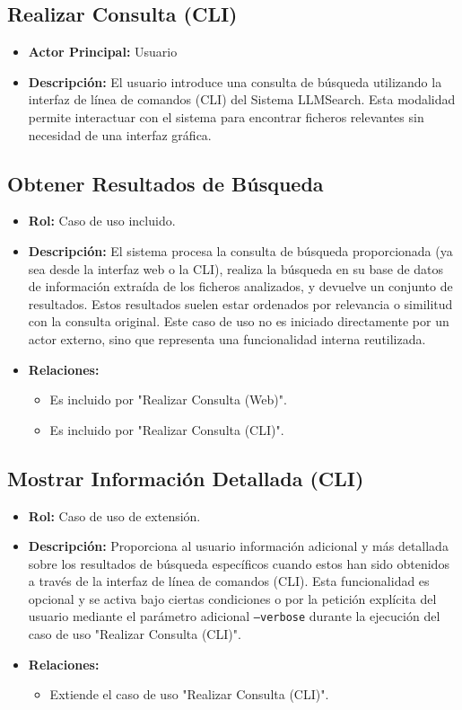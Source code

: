 \subsection{Realizar Consulta (CLI)}
\begin{itemize}
\item \textbf{Actor Principal:} Usuario
\item \textbf{Descripción:} El usuario introduce una consulta de búsqueda utilizando la interfaz de línea de comandos (CLI) del Sistema LLMSearch. Esta modalidad permite interactuar con el sistema para encontrar ficheros relevantes sin necesidad de una interfaz gráfica.
\end{itemize}

\subsection{Obtener Resultados de Búsqueda}
\begin{itemize}
\item \textbf{Rol:} Caso de uso incluido.
\item \textbf{Descripción:} El sistema procesa la consulta de búsqueda proporcionada (ya sea desde la interfaz web o la CLI), realiza la búsqueda en su base de datos de información extraída de los ficheros analizados, y devuelve un conjunto de resultados. Estos resultados suelen estar ordenados por relevancia o similitud con la consulta original. Este caso de uso no es iniciado directamente por un actor externo, sino que representa una funcionalidad interna reutilizada.
\item \textbf{Relaciones:}
\begin{itemize}
\item Es incluido por "Realizar Consulta (Web)".
\item Es incluido por "Realizar Consulta (CLI)".
\end{itemize}
\end{itemize}

\subsection{Mostrar Información Detallada (CLI)}
\begin{itemize}
\item \textbf{Rol:} Caso de uso de extensión.
\item \textbf{Descripción:} Proporciona al usuario información adicional y más detallada sobre los resultados de búsqueda específicos cuando estos han sido obtenidos a través de la interfaz de línea de comandos (CLI). Esta funcionalidad es opcional y se activa bajo ciertas condiciones o por la petición explícita del usuario mediante el parámetro adicional \texttt{--verbose} durante la ejecución del caso de uso "Realizar Consulta (CLI)".
\item \textbf{Relaciones:}
\begin{itemize}
\item Extiende el caso de uso "Realizar Consulta (CLI)".
\end{itemize}
\end{itemize}

